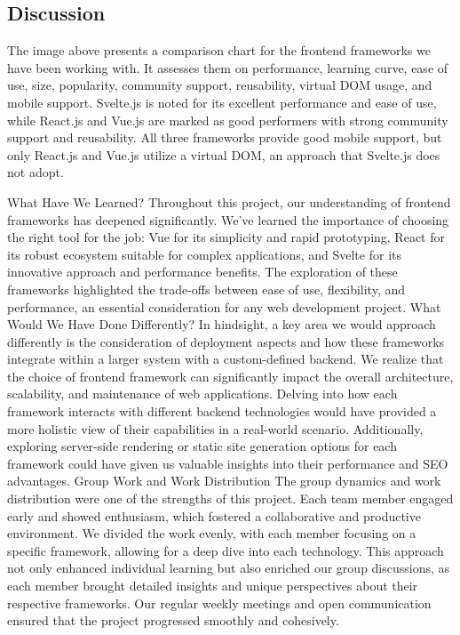 \subsection*{Discussion}

The image above presents a comparison chart for the frontend frameworks we have been working with. It assesses them on performance, learning curve, ease of use, size, popularity, community support, reusability, virtual DOM usage, and mobile support. Svelte.js is noted for its excellent performance and ease of use, while React.js and Vue.js are marked as good performers with strong community support and reusability. All three frameworks provide good mobile support, but only React.js and Vue.js utilize a virtual DOM, an approach that Svelte.js does not adopt.

What Have We Learned?
Throughout this project, our understanding of frontend frameworks has deepened significantly. We've learned the importance of choosing the right tool for the job: Vue for its simplicity and rapid prototyping, React for its robust ecosystem suitable for complex applications, and Svelte for its innovative approach and performance benefits. The exploration of these frameworks highlighted the trade-offs between ease of use, flexibility, and performance, an essential consideration for any web development project.
What Would We Have Done Differently?
In hindsight, a key area we would approach differently is the consideration of deployment aspects and how these frameworks integrate within a larger system with a custom-defined backend. We realize that the choice of frontend framework can significantly impact the overall architecture, scalability, and maintenance of web applications. Delving into how each framework interacts with different backend technologies would have provided a more holistic view of their capabilities in a real-world scenario. Additionally, exploring server-side rendering or static site generation options for each framework could have given us valuable insights into their performance and SEO advantages.
Group Work and Work Distribution
The group dynamics and work distribution were one of the strengths of this project. Each team member engaged early and showed enthusiasm, which fostered a collaborative and productive environment. We divided the work evenly, with each member focusing on a specific framework, allowing for a deep dive into each technology. This approach not only enhanced individual learning but also enriched our group discussions, as each member brought detailed insights and unique perspectives about their respective frameworks. Our regular weekly meetings and open communication ensured that the project progressed smoothly and cohesively.
